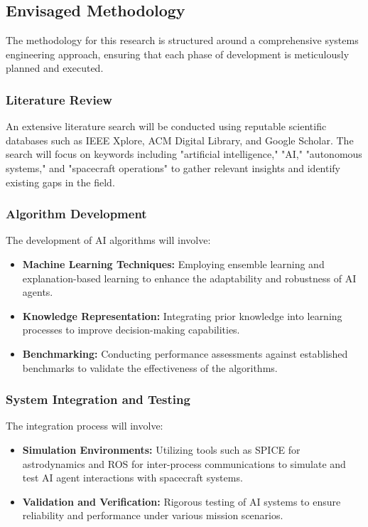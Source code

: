 \documentclass[a4paper,12pt]{article}
\begin{document}
\subsection{Envisaged Methodology}

The methodology for this research is structured around a comprehensive systems engineering approach, ensuring that each phase of development is meticulously planned and executed.

\subsubsection{Literature Review}

An extensive literature search will be conducted using reputable scientific databases such as IEEE Xplore, ACM Digital Library, and Google Scholar. The search will focus on keywords including "artificial intelligence," "AI," "autonomous systems," and "spacecraft operations" to gather relevant insights and identify existing gaps in the field.

\subsubsection{Algorithm Development}

The development of AI algorithms will involve:

\begin{itemize}
    \item \textbf{Machine Learning Techniques:} Employing ensemble learning and explanation-based learning to enhance the adaptability and robustness of AI agents.
    \item \textbf{Knowledge Representation:} Integrating prior knowledge into learning processes to improve decision-making capabilities.
    \item \textbf{Benchmarking:} Conducting performance assessments against established benchmarks to validate the effectiveness of the algorithms.
\end{itemize}

\subsubsection{System Integration and Testing}

The integration process will involve:

\begin{itemize}
    \item \textbf{Simulation Environments:} Utilizing tools such as SPICE for astrodynamics and ROS for inter-process communications to simulate and test AI agent interactions with spacecraft systems.
    \item \textbf{Validation and Verification:} Rigorous testing of AI systems to ensure reliability and performance under various mission scenarios.
\end{itemize}
\end{document}
